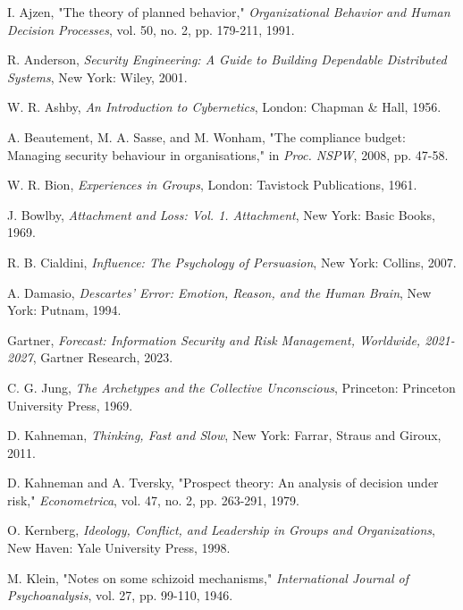 \documentclass[journal]{IEEEtran}
\begin{document}
\begin{thebibliography}{99}

I. Ajzen, "The theory of planned behavior," \textit{Organizational Behavior and Human Decision Processes}, vol. 50, no. 2, pp. 179-211, 1991.

R. Anderson, \textit{Security Engineering: A Guide to Building Dependable Distributed Systems}, New York: Wiley, 2001.

W. R. Ashby, \textit{An Introduction to Cybernetics}, London: Chapman \& Hall, 1956.

A. Beautement, M. A. Sasse, and M. Wonham, "The compliance budget: Managing security behaviour in organisations," in \textit{Proc. NSPW}, 2008, pp. 47-58.

W. R. Bion, \textit{Experiences in Groups}, London: Tavistock Publications, 1961.

J. Bowlby, \textit{Attachment and Loss: Vol. 1. Attachment}, New York: Basic Books, 1969.

R. B. Cialdini, \textit{Influence: The Psychology of Persuasion}, New York: Collins, 2007.

A. Damasio, \textit{Descartes' Error: Emotion, Reason, and the Human Brain}, New York: Putnam, 1994.

Gartner, \textit{Forecast: Information Security and Risk Management, Worldwide, 2021-2027}, Gartner Research, 2023.

C. G. Jung, \textit{The Archetypes and the Collective Unconscious}, Princeton: Princeton University Press, 1969.

D. Kahneman, \textit{Thinking, Fast and Slow}, New York: Farrar, Straus and Giroux, 2011.

D. Kahneman and A. Tversky, "Prospect theory: An analysis of decision under risk," \textit{Econometrica}, vol. 47, no. 2, pp. 263-291, 1979.

O. Kernberg, \textit{Ideology, Conflict, and Leadership in Groups and Organizations}, New Haven: Yale University Press, 1998.

M. Klein, "Notes on some schizoid mechanisms," \textit{International Journal of Psychoanalysis}, vol. 27, pp. 99-110, 1946.


\end{thebibliography}
\end{document}
